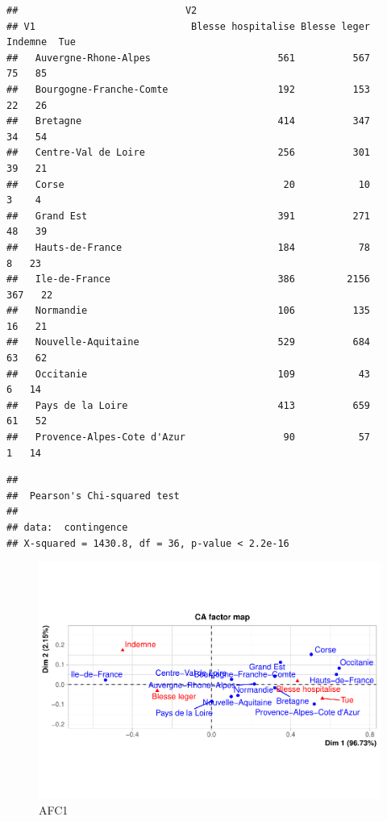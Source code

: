 \documentclass[french,]{compterendu}
\theoremstyle{urcastyle}
\theoremstyle{remark}
\begin{document}
\begin{verbatim}
##                             V2
## V1                           Blesse hospitalise Blesse leger Indemne  Tue
##   Auvergne-Rhone-Alpes                      561          567      75   85
##   Bourgogne-Franche-Comte                   192          153      22   26
##   Bretagne                                  414          347      34   54
##   Centre-Val de Loire                       256          301      39   21
##   Corse                                      20           10       3    4
##   Grand Est                                 391          271      48   39
##   Hauts-de-France                           184           78       8   23
##   Ile-de-France                             386         2156     367   22
##   Normandie                                 106          135      16   21
##   Nouvelle-Aquitaine                        529          684      63   62
##   Occitanie                                 109           43       6   14
##   Pays de la Loire                          413          659      61   52
##   Provence-Alpes-Cote d'Azur                 90           57       1   14
\end{verbatim}

\begin{verbatim}
## 
##  Pearson's Chi-squared test
## 
## data:  contingence
## X-squared = 1430.8, df = 36, p-value < 2.2e-16
\end{verbatim}

\begin{figure}[H]

{\centering \includegraphics[width=0.9\linewidth]{Rapport_ADD_LEO-GABET_files/figure-latex/afc1-1} 

}

\caption{AFC1}\label{fig:afc1}
\end{figure}
\end{document}
